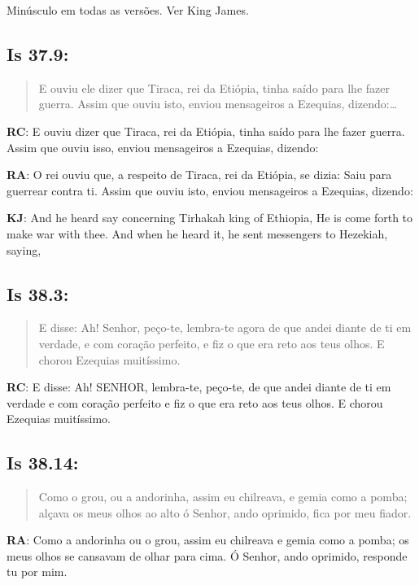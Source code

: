 Minúsculo em todas as versões.
Ver King James.

\subsection*{Is 37.9:} 
 \begin{quote}
  \small
 E\uwave{,} ouviu ele dizer que Tiraca, rei da Etiópia, tinha saído para lhe fazer guerra. Assim que ouviu isto, enviou mensageiros a Ezequias, dizendo:\ldots
 \end{quote}

\textbf{RC}: E ouviu dizer que Tiraca, rei da Etiópia, tinha saído para lhe fazer guerra. Assim que ouviu isso, enviou mensageiros a Ezequias, dizendo:

\textbf{RA}: O rei ouviu que, a respeito de Tiraca, rei da Etiópia, se dizia: Saiu para guerrear contra ti. Assim que ouviu isto, enviou mensageiros a Ezequias, dizendo:

\textbf{KJ}: And he heard say concerning Tirhakah king of Ethiopia, He is come forth to make war with thee. And when he heard it, he sent messengers to Hezekiah, saying,

\subsection*{Is 38.3:} 
 \begin{quote}
  \small
 E disse: Ah! Senhor, peço-te, lembra-te agora\uwave{,} de que andei diante de ti em verdade, e com coração perfeito, e fiz o que era reto aos teus olhos. E chorou Ezequias muitíssimo.
 \end{quote}

\textbf{RC}: E disse: Ah! SENHOR, lembra-te, peço-te, de que andei diante de ti em verdade e com coração perfeito e fiz o que era reto aos teus olhos. E chorou Ezequias muitíssimo.

\subsection*{Is 38.14:} 
 \begin{quote}
  \small
 Como o grou, ou a andorinha, assim eu chilreava, e gemia como a pomba; alçava os meus olhos ao alto\uwave{;} ó Senhor, ando oprimido, fica por meu fiador.
 \end{quote}

\textbf{RA}: Como a andorinha ou o grou, assim eu chilreava e gemia como a pomba; os meus olhos se cansavam de olhar para cima. Ó Senhor, ando oprimido, responde tu por mim.


